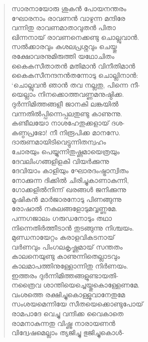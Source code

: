 \begin{verse}
സാരനായോരു ശുകന്‍ പോയനന്തരം\\
ഘോരനാം രാവണന്‍ വാഴുന്ന മന്ദിരേ\\
വന്നിതു രാവണമാതാവുതന്‍ പിതാ\\
ഖിന്നനായ് രാവണനെക്കണ്ടു ചൊല്ലുവാന്‍.\\
സല്‍ക്കാരവും കുശലപ്രശ്നവും ചെയ്തു\\
രക്ഷോവരനുമിരുത്തി യഥോചിതം\\
കൈകസീതാതന്‍ മതിമാന്‍ വിനീതിമാന്‍\\
കൈകസീനന്ദനന്‍തന്നോടു ചൊല്ലിനാന്‍:\\
‘ചൊല്ലുവന്‍ ഞാന്‍ തവ നല്ലതു, പിന്നെ നീ-\\
യെല്ലാം നിനക്കൊത്തവണ്ണമനുഷ്ഠിക്ക.\\
ദുര്‍ന്നിമിത്തങ്ങളീ ജാനകി ലങ്കയില്‍\\
വന്നതില്‍പ്പിന്നെപ്പലതുണ്ടു കാണുന്നു.\\
കണ്ടീലയോ നാശഹേതുക്കളായ് ദശ-\\
കണ്ഠപ്രഭോ! നീ നിരൂപിക്ക മാനസേ.\\
ദാരുണമായിടിവെട്ടുന്നിതന്വഹം\\
ചോരയും പെയ്യുന്നിതുഷ്ണമായെത്രയും\\
ദേവലിംഗങ്ങളിളകി വിയര്‍ക്കുന്നു\\
ദേവിയാം കാളിയും ഘോരദംഷ്ട്രാന്വിതം\\
നോക്കുന്ന ദിക്കില്‍ ചിരിച്ചുകാണാകുന്നി,\\
ഗോക്കളില്‍നിന്ന് ഖരങ്ങള്‍ ജനിക്കുന്നു\\
മൂഷികന്‍ മാര്‍ജാരനോടു പിണങ്ങുന്നു\\
രോഷാല്‍ നകുലങ്ങളോടുമവ്വണ്ണമേ.\\
പന്നഗജാലം ഗരുഡനോടും തഥാ\\
നിന്നെതിര്‍ത്തീടാന്‍ തുടങ്ങുന്നു നിശ്ചയം.\\
മുണ്ഡനായേറ്റം കരാളവികടനായ്\\
വര്‍ണവും പിംഗലകൃഷ്ണമായ് സന്തതം\\
കാലനെയുണ്ടു കാണുന്നിതെല്ലാടവും\\
കാലമാപത്തിനുള്ളോന്നിതു നിര്‍ണയം.\\
ഇത്തരം ദുര്‍ന്നിമിത്തങ്ങളുണ്ടായതി-\\
നത്രൈവ ശാന്തിയെച്ചെയ്തുകൊള്ളേണമേ.\\
വംശത്തെ രക്ഷിച്ചുകൊള്ളുവാനേതുമേ\\
സംശയമെന്നിയേ സീതയെക്കൊണ്ടുപോയ്\\
രാമപാദേ വെച്ചു വന്ദിക്ക വൈകാതെ\\
രാമനാകുന്നതു വിഷ്ണു നാരായണന്‍\\
വിദ്വേഷമെല്ലാം ത്യജിച്ചു ഭുജിച്ചുകൊള്‍-\\

\end{verse}
